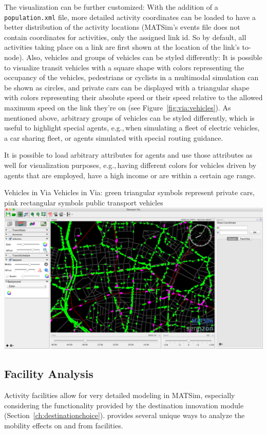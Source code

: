 The visualization can be further customized: With the addition of a \lstinline|population.xml| file, more detailed activity coordinates can be loaded to have a
better distribution of the activity locations (MATSim's events file does not
contain coordinates for activities, only the assigned link id. So by default,
all activities taking place on a link are first shown at the location of
the link's to-node). Also, vehicles and groups of vehicles can be styled
differently: It is possible to visualize transit vehicles with a square shape
with colors representing the occupancy of the vehicles, pedestrians or
cyclists in a multimodal simulation can be shown as circles, and private cars
can be displayed with a triangular shape with colors representing their
absolute speed or their speed relative to the allowed maximum speed on the link
they're on (see Figure~\ref{fig:via:vehicles}). As mentioned above, arbitrary
groups of vehicles can be styled differently, which is useful to highlight
special agents, e.g.,\,when simulating a fleet of electric vehicles, a car sharing
fleet, or agents simulated with special routing guidance.

It is possible to load arbitrary attributes for agents and use those attributes
as well for visualization purposes, e.g.,\,having different colors for vehicles
driven by agents that are employed, have a high income or are within a certain
age range.

\createfigure%
{Vehicles in Via}%
{Vehicles in Via: green triangular symbols represent private cars, pink rectangular symbols public transport vehicles }%
{\label{fig:via:vehicles}}%
{\includegraphics[width=1.\textwidth,angle=0]{./extending/figures/via/vehicles}}%
{}

\subsection{Facility Analysis}
Activity facilities allow for very detailed modeling in MATSim, especially
considering the functionality provided by the destination innovation module
(Section~\ref{ch:destinationchoice}). \Via{} provides several unique ways to
analyze the mobility effects on and from facilities.

